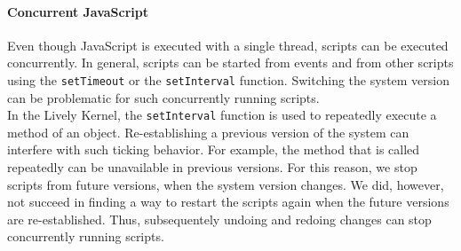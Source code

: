 \paragraph{Concurrent JavaScript}
Even though JavaScript is executed with a single thread, scripts can be executed concurrently.
In general, scripts can be started from events and from other scripts using the \lstinline{setTimeout} or the \lstinline{setInterval} function.
Switching the system version can be problematic for such concurrently running scripts.\\
In the Lively Kernel, the \lstinline{setInterval} function is used to repeatedly execute a method of an object.
Re-establishing a previous version of the system can interfere with such ticking behavior.
For example, the method that is called repeatedly can be unavailable in previous versions.
For this reason, we stop scripts from future versions, when the system version changes.
We did, however, not succeed in finding a way to restart the scripts again when the future versions are re-established.
Thus, subsequentely undoing and redoing changes can stop concurrently running scripts.
